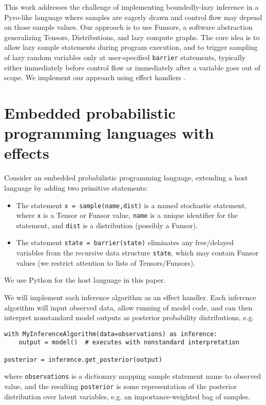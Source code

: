 \documentclass[anonymous=false, %
               format=acmsmall, %
               review=true, %
               screen=true, %
               nonacm=true]{acmart}
\begin{document}
This work addresses the challenge of implementing boundedly-lazy inference in a Pyro-like language where samples are eagerly drawn and control flow may depend on those sample values.
Our approach is to use Funsors, a software abstraction generalizing Tensors, Distributions, and lazy compute graphs.
The core idea is to allow lazy sample statements during program execution, and to trigger sampling of lazy random variables only at user-specified \verb$barrier$ statements, typically either immediately before control flow or immediately after a variable goes out of scope.
We implement our approach using effect handlers \cite{moore2018effect,pretnar2015introduction}.

\section{Embedded probabilistic programming languages with effects}

Consider an embedded probabilistic programming language, extending a host language by adding two primitive statements:
\begin{itemize}
  \item The statement \verb$x = sample(name,dist)$ is a named stochastic statement, where \verb$x$ is a Tensor or Funsor value, \verb$name$ is a unique identifier for the statement, and \verb$dist$ is a distribution (possibly a Funsor).
  \item The statement \verb$state = barrier(state)$ eliminates any free/delayed variables from the recursive data structure \verb$state$, which may contain Funsor values (we restrict attention to lists of Tensors/Funsors).
\end{itemize}
We use Python for the host language in this paper.

We will implement each inference algorithm as an effect handler.
Each inference algorithm will input observed data, allow running of model code, and can then interpret nonstandard model outputs as posterior probability distributions, e.g.
\begin{verbatim}
with MyInferenceAlgorithm(data=observations) as inference:
    output = model()  # executes with nonstandard interpretation

posterior = inference.get_posterior(output)
\end{verbatim}
where \verb$observations$ is a dictionary mapping sample statement name to observed value, and the resulting \verb$posterior$ is some representation of the posterior distribution over latent variables, e.g. an importance-weighted bag of samples.
\end{document}
